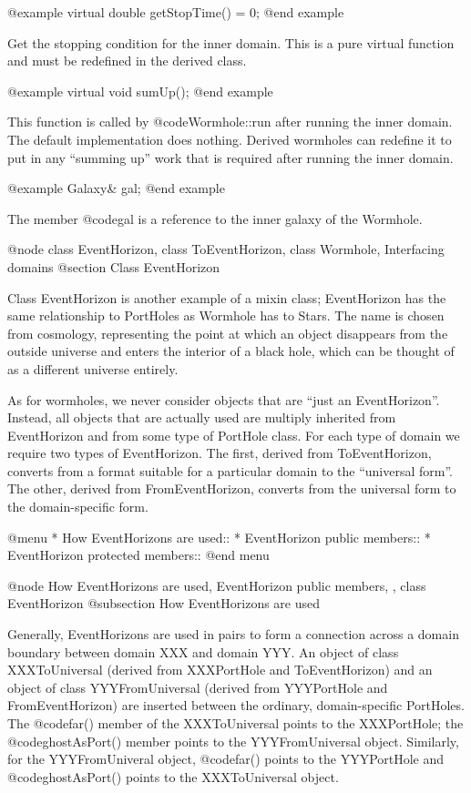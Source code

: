 @example
virtual double getStopTime() = 0;
@end example

Get the stopping condition for the inner domain.  This is a pure
virtual function and must be redefined in the derived class.

@example
virtual void sumUp();
@end example

This function is called by @code{Wormhole::run} after running the
inner domain.  The default implementation does nothing.  Derived
wormholes can redefine it to put in any ``summing up'' work that is
required after running the inner domain.

@example
Galaxy& gal;
@end example

The member @code{gal} is a reference to the inner galaxy of the Wormhole.

@node class EventHorizon, class ToEventHorizon, class Wormhole, Interfacing domains
@section Class EventHorizon

Class EventHorizon is another example of a mixin class; EventHorizon has
the same relationship to PortHoles as Wormhole has to Stars.  The name
is chosen from cosmology, representing the point at which an object
disappears from the outside universe and enters the interior of a black
hole, which can be thought of as a different universe entirely.

As for wormholes, we never consider objects that are ``just an
EventHorizon''.  Instead, all objects that are actually used are multiply
inherited from EventHorizon and from some type of PortHole class.  For
each type of domain we require two types of EventHorizon.  The first, derived
from ToEventHorizon, converts from a format suitable for a particular
domain to the ``universal form''.  The other, derived from FromEventHorizon,
converts from the universal form to the domain-specific form.

@menu
* How EventHorizons are used::  
* EventHorizon public members::  
* EventHorizon protected members::  
@end menu

@node How EventHorizons are used, EventHorizon public members,  , class EventHorizon
@subsection How EventHorizons are used

Generally, EventHorizons are used in pairs to form a connection
across a domain boundary between domain XXX and domain YYY.  An object
of class XXXToUniversal (derived from XXXPortHole and ToEventHorizon)
and an object of class YYYFromUniversal (derived from YYYPortHole and
FromEventHorizon) are inserted between the ordinary, domain-specific
PortHoles.  The @code{far()} member of the XXXToUniversal points
to the XXXPortHole; the @code{ghostAsPort()} member points to
the YYYFromUniversal object.  Similarly, for the YYYFromUniveral
object, @code{far()} points to the YYYPortHole and @code{ghostAsPort()}
points to the XXXToUniversal object.

